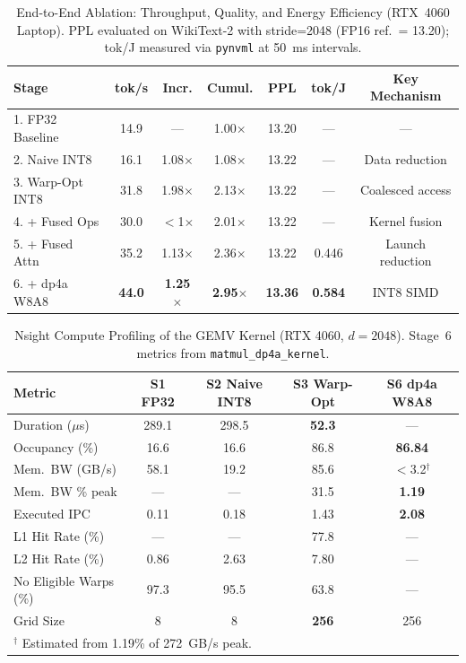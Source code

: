 \documentclass[conference]{IEEEtran}
\begin{document}
\begin{table}[htbp]
\centering
\caption{End-to-End Ablation: Throughput, Quality, and Energy Efficiency (RTX~4060 Laptop). PPL evaluated on WikiText-2 with stride=2048 (FP16 ref.\ = 13.20); tok/J measured via \texttt{pynvml} at 50~ms intervals.}
\label{tab:ablation_summary}
\setlength{\tabcolsep}{2pt}
\scriptsize
\begin{tabular}{lcccccc}
\toprule
\textbf{Stage} & \textbf{tok/s} & \textbf{Incr.} & \textbf{Cumul.} & \textbf{PPL} & \textbf{tok/J} & \textbf{Key Mechanism} \\
\midrule
1. FP32 Baseline  & 14.9 & ---          & 1.00$\times$ & 13.20        & ---   & --- \\
2. Naive INT8     & 16.1 & 1.08$\times$ & 1.08$\times$ & 13.22        & ---   & Data reduction \\
3. Warp-Opt INT8  & 31.8 & 1.98$\times$ & 2.13$\times$ & 13.22        & ---   & Coalesced access \\
4. + Fused Ops    & 30.0 & $<$1$\times$ & 2.01$\times$ & 13.22        & ---   & Kernel fusion \\
5. + Fused Attn   & 35.2 & 1.13$\times$ & 2.36$\times$ & 13.22        & 0.446 & Launch reduction \\
6. + dp4a W8A8    & \textbf{44.0} & \textbf{1.25}$\times$ & \textbf{2.95}$\times$ & \textbf{13.36} & \textbf{0.584} & INT8 SIMD \\
\bottomrule
\end{tabular}
\end{table}

\begin{table}[htbp]
\centering
\caption{Nsight Compute Profiling of the GEMV Kernel (RTX 4060, $d=2048$). Stage~6 metrics from \texttt{matmul\_dp4a\_kernel}.}
\label{tab:nsight}
\setlength{\tabcolsep}{2pt}
\scriptsize
\begin{tabular}{lcccc}
\toprule
\textbf{Metric} & \textbf{S1 FP32} & \textbf{S2 Naive INT8} & \textbf{S3 Warp-Opt} & \textbf{S6 dp4a W8A8} \\
\midrule
Duration ($\mu$s) & 289.1 & 298.5 & \textbf{52.3} & --- \\
Occupancy (\%) & 16.6 & 16.6 & 86.8 & \textbf{86.84} \\
Mem.\ BW (GB/s) & 58.1 & 19.2 & 85.6 & $<$3.2$^{\dagger}$ \\
Mem.\ BW \% peak & --- & --- & 31.5 & \textbf{1.19} \\
Executed IPC & 0.11 & 0.18 & 1.43 & \textbf{2.08} \\
L1 Hit Rate (\%) & --- & --- & 77.8 & --- \\
L2 Hit Rate (\%) & 0.86 & 2.63 & 7.80 & --- \\
No Eligible Warps (\%) & 97.3 & 95.5 & 63.8 & --- \\
Grid Size & 8 & 8 & \textbf{256} & 256 \\
\bottomrule
\multicolumn{5}{l}{\scriptsize $^{\dagger}$ Estimated from 1.19\% of 272~GB/s peak.} \\
\end{tabular}
\end{table}
\end{document}
